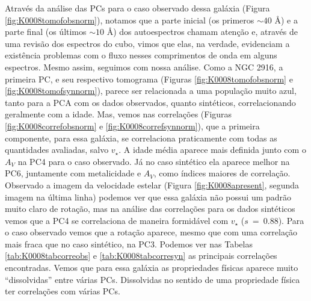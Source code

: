 Através da análise das PCs para o caso observado dessa galáxia (Figura \ref{fig:K0008tomofobsnorm}), notamos que a parte
inicial (os primeros $\sim40$ \AA) e a parte final (os últimos $\sim10$ \AA) dos autoespectros chamam atenção e, através
de uma revisão dos espectros do cubo, vimos que elas, na verdade, evidenciam a existência problemas com o fluxo nesses
comprimentos de onda em alguns espectros. Mesmo assim, seguimos com nossa análise. Como a NGC 2916, a primeira PC, e seu
respectivo tomograma (Figuras \ref{fig:K0008tomofobsnorm} e \ref{fig:K0008tomofsynnorm}), parece ser relacionada a uma
população muito azul, tanto para a PCA com os dados observados, quanto sintéticos, correlacionando geralmente com a
idade. Mas, vemos nas correlações (Figuras \ref{fig:K0008correfobsnorm} e \ref{fig:K0008correfsynnorm}), que a primeira
componente, para essa galáxia, se correlaciona praticamente com todas as quantidades avaliadas, salvo $v_\star$. A idade
média aparece mais definida junto com o $A_V$ na PC4 para o caso observado. Já no caso sintético ela aparece melhor na
PC6, juntamente com metalicidade e $A_V$, como índices maiores de correlação. Observado a imagem da velocidade estelar
(Figura \ref{fig:K0008apresent}, segunda imagem na última linha) podemos ver que essa galáxia não possui um padrão muito
claro de rotação, mas na análise das correlações para os dados sintéticos vemos que a PC4 se correlaciona de maneira
formidável com $v_\star$ ($s\ =\ 0.88$). Para o caso observado vemos que a rotação aparece, mesmo que com uma correlação
mais fraca que no caso sintético, na PC3. Podemos ver nas Tabelas \ref{tab:K0008tabcorreobs} e
\ref{tab:K0008tabcorresyn} as principais correlações encontradas. Vemos que para essa galáxia as propriedades físicas
aparece muito ``dissolvidas'' entre várias PCs. Dissolvidas no sentido de uma propriedade física ter correlações com
várias PCs.

